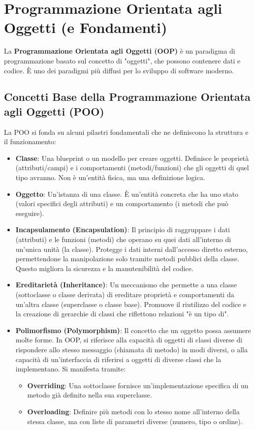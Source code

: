 \chapter{Programmazione Orientata agli Oggetti (e Fondamenti)}

La \textbf{Programmazione Orientata agli Oggetti (OOP)} è un paradigma di programmazione basato sul concetto di "oggetti", che possono contenere dati e codice. È uno dei paradigmi più diffusi per lo sviluppo di software moderno.

\section{Concetti Base della Programmazione Orientata agli Oggetti (POO)}
La POO si fonda su alcuni pilastri fondamentali che ne definiscono la struttura e il funzionamento:
\begin{itemize}
    \item \textbf{Classe}: Una blueprint o un modello per creare oggetti. Definisce le proprietà (attributi/campi) e i comportamenti (metodi/funzioni) che gli oggetti di quel tipo avranno. Non è un'entità fisica, ma una definizione logica.
    \item \textbf{Oggetto}: Un'istanza di una classe. È un'entità concreta che ha uno stato (valori specifici degli attributi) e un comportamento (i metodi che può eseguire).
    \item \textbf{Incapsulamento (Encapsulation)}: Il principio di raggruppare i dati (attributi) e le funzioni (metodi) che operano su quei dati all'interno di un'unica unità (la classe). Protegge i dati interni dall'accesso diretto esterno, permettendone la manipolazione solo tramite metodi pubblici della classe. Questo migliora la sicurezza e la manutenibilità del codice.
    \item \textbf{Ereditarietà (Inheritance)}: Un meccanismo che permette a una classe (sottoclasse o classe derivata) di ereditare proprietà e comportamenti da un'altra classe (superclasse o classe base). Promuove il riutilizzo del codice e la creazione di gerarchie di classi che riflettono relazioni "è un tipo di".
    \item \textbf{Polimorfismo (Polymorphism)}: Il concetto che un oggetto possa assumere molte forme. In OOP, si riferisce alla capacità di oggetti di classi diverse di rispondere allo stesso messaggio (chiamata di metodo) in modi diversi, o alla capacità di un'interfaccia di riferirsi a oggetti di diverse classi che la implementano. Si manifesta tramite:
    \begin{itemize}
        \item \textbf{Overriding}: Una sottoclasse fornisce un'implementazione specifica di un metodo già definito nella sua superclasse.
        \item \textbf{Overloading}: Definire più metodi con lo stesso nome all'interno della stessa classe, ma con liste di parametri diverse (numero, tipo o ordine).
    \end{itemize}
\end{itemize}


